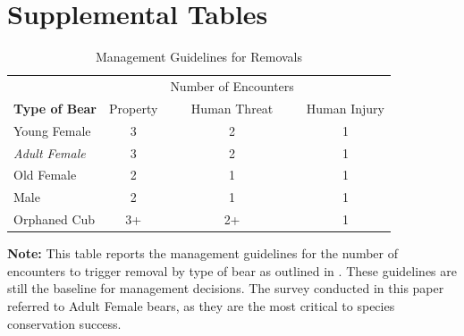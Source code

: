 \documentclass[english,12pt]{article}
\begin{document}
\newpage
\section{Supplemental Tables} \label{sec: app-tabs}
\begin{table}[h]
    \centering
    \caption{Management Guidelines for Removals}
\begin{tabular}{lccc}\toprule
                      & \multicolumn{1}{l}{} & \multicolumn{1}{l}{Number of Encounters} & \multicolumn{1}{l}{} \\
\textbf{Type of Bear} & Property             & Human Threat                             & Human Injury         \\ \midrule
Young Female          & 3                    & 2                                        & 1                    \\
\textit{Adult Female}         & 3                    & 2                                        & 1                    \\
Old Female            & 2                    & 1                                        & 1                    \\
Male                  & 2                    & 1                                        & 1                    \\
Orphaned Cub          & 3+                   & 2+                                       & 1 \\\bottomrule                  
    \end{tabular}
    \begin{minipage}{.8\textwidth} 
    \vspace{1em}
    \footnotesize{{\bf{Note:}} This table reports the management guidelines for the number of encounters to trigger removal by type of bear as outlined in \cite{BearReport}. These guidelines are still the baseline for management decisions. The survey conducted in this paper referred to Adult Female bears, as they are the most critical to species conservation success.}
    \label{tab:guidelines}
    \end{minipage}
\end{table}
\end{document}
